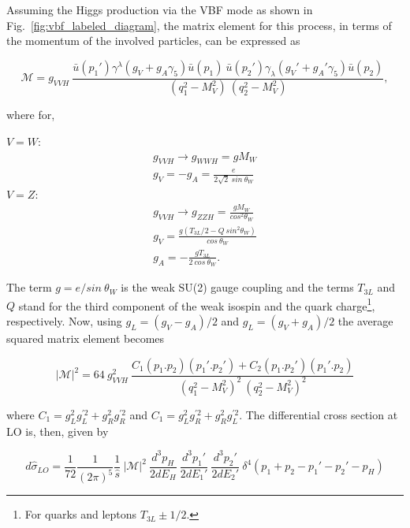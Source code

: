Assuming the Higgs production via the VBF mode as shown in Fig.~\ref{fig:vbf_labeled_diagram}, the matrix element for this process, in terms of the momentum of the involved particles, can be expressed as \cite{bib:PhysLettB136-3-1984}

\begin{equation}
\mathcal{M} = g_{VVH}~\frac{\bar{u}(p_{1}')\gamma^{\lambda}(g_{V}+g_{A}\gamma_{5})\bar{u}(p_{1})~\bar{u}(p_{2}')\gamma_{\lambda}(g_{V}'+g_{A}'\gamma_{5})\bar{u}(p_{2})}{(q_{1}^{2}-M_{V}^{2})~(q_{2}^{2}-M_{V}^{2})},
\end{equation}

where for,

\begin{multicols}{2}
$V = W$:
\begin{eqnarray}
g_{VVH} \rightarrow g_{WWH} = gM_{W}\\
g_{V} = -g_{A} = \frac{e}{2\sqrt{2}~sin~\theta_{W}}
\end{eqnarray}
$V = Z$:
\begin{eqnarray}
g_{VVH} \rightarrow g_{ZZH} = \frac{gM_{W}}{cos^{2}\theta_{W}}\\
g_{V} = \frac{g(T_{3L}/2 - Q~sin^{2}\theta_{W})}{cos~\theta_{W}}\\
g_{A} = - \frac{gT_{3L}}{2~cos~\theta_{W}}.
\end{eqnarray}
\end{multicols}

The term $g = e/sin~\theta_{W}$ is the weak SU(2) gauge coupling and the terms $T_{3L}$ and $Q$ stand for the third component of the weak isospin and the quark charge\footnote{For quarks and leptons $T_{3L} \pm 1/2$.}, respectively. Now, using $g_{L} = (g_{V}-g_{A})/2$ and $g_{L} = (g_{V}+g_{A})/2$ the average squared matrix element becomes \cite{bib:PhysLettB136-3-1984,bib:PhysRep457-1-2005,bib:NuclPhysB287-1987}

\begin{equation}
|\mathcal{M}|^{2} = 64~g_{VVH}^{2}~\frac{C_{1}(p_{1}.p_{2})(p_{1}'.p_{2}') + C_{2}(p_{1}.p_{2}')(p_{1}'.p_{2})}{(q_{1}^{2}-M_{V}^{2})^{2}~(q_{2}^{2}-M_{V}^{2})^{2}}
\end{equation}

where $C_{1} = g_{L}^{2}g_{L}^{'2} + g_{R}^{2}g_{R}^{'2}$ and $C_{1} = g_{L}^{2}g_{R}^{'2} + g_{R}^{2}g_{L}^{'2}$. The differential cross section at LO is, then, given by \cite{bib:PhysRep457-1-2005}

\begin{equation}
d\hat{\sigma}_{LO} = \frac{1}{72}\frac{1}{(2\pi)^{5}}\frac{1}{\hat{s}}~|\mathcal{M}|^{2}~\frac{d^{3}p_{H}}{2dE_{H}}~\frac{d^{3}p_{1}'}{2dE_{1}'}~\frac{d^{3}p_{2}'}{2dE_{2}'}~\delta^{4}(p_{1}+p_{2}-p_{1}'-p_{2}'-p_{H})
\end{equation}

